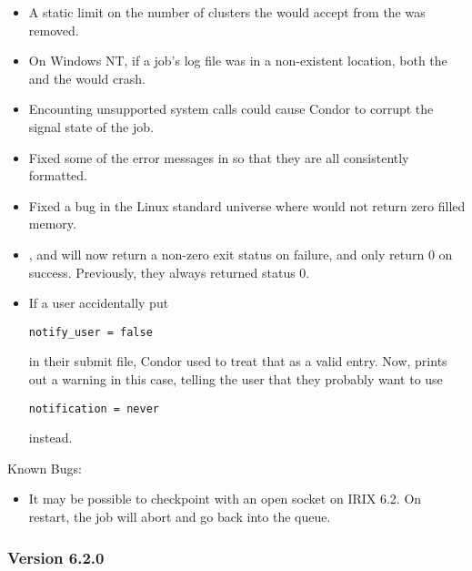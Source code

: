 \begin{itemize}
\item A static limit on the number of clusters the 
would accept from the  was removed.

\item On Windows NT, if a job's log file was in a non-existent location,
both the  and the  would crash.

\item Encounting unsupported system calls could cause Condor to corrupt the
signal state of the job. 

\item Fixed some of the error messages in  so that they
are all consistently formatted.

\item Fixed a bug in the Linux standard universe where 
would not return zero filled memory.

\item {},  and  will now return
a non-zero exit status on failure, and only return 0 on success.
Previously, they always returned status 0.

\item If a user accidentally put \begin{verbatim}notify_user = false\end{verbatim} in their submit file, Condor used to treat that
as a valid entry.
Now,  prints out a warning in this case, telling the
user that they probably want to use 
\begin{verbatim}notification = never\end{verbatim} instead.

\end{itemize}

\noindent Known Bugs:

\begin{itemize}

\item It may be possible to checkpoint with an open socket on IRIX 6.2.
On restart, the job will abort and go back into the queue. 

\end{itemize}

\subsubsection{\label{sec:New-6-2-0}Version 6.2.0}

